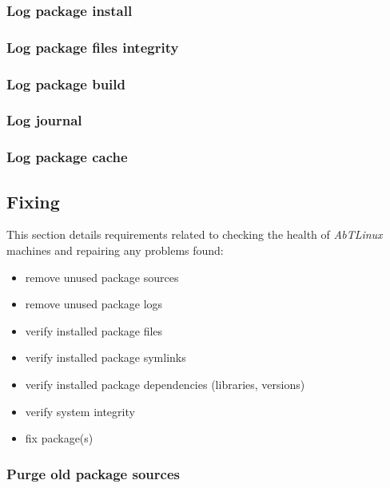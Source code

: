 %
%
\subsubsection{Log package install}


\newpage
\subsubsection{Log package files integrity}


\newpage
\subsubsection{Log package build}


\newpage
\subsubsection{Log journal}


\newpage
\subsubsection{Log package cache}




\newpage
\subsection{Fixing}
This section details requirements related to checking the health of
\emph{AbTLinux} machines and repairing any problems found:

\begin{itemize}
  \item remove unused package sources
  \item remove unused package logs
  \item verify installed package files
  \item verify installed package symlinks
  \item verify installed package dependencies (libraries, versions)
  \item verify system integrity 
  \item fix package(s)
\end{itemize}

%
%
\subsubsection{Purge old package sources}


